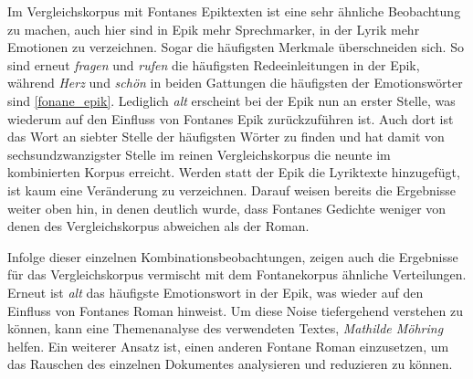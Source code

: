 \documentclass[a4paper,10p]{article}
\begin{document}
Im Vergleichskorpus mit Fontanes Epiktexten ist eine sehr ähnliche Beobachtung zu machen, auch hier sind in Epik mehr Sprechmarker, in der Lyrik mehr Emotionen zu verzeichnen. Sogar die häufigsten Merkmale überschneiden sich. So sind erneut \textit{fragen} und \textit{rufen} die häufigsten Redeeinleitungen in der Epik, während \textit{Herz} und \textit{schön} in beiden Gattungen die häufigsten der Emotionswörter sind \ref{fonane_epik}. Lediglich \textit{alt} erscheint bei der Epik nun an erster Stelle, was wiederum auf den Einfluss von Fontanes Epik zurückzuführen ist. Auch dort ist das Wort an siebter Stelle der häufigsten Wörter zu finden und hat damit von sechsundzwanzigster Stelle im reinen Vergleichskorpus die neunte im kombinierten Korpus erreicht. Werden statt der Epik die Lyriktexte hinzugefügt, ist kaum eine Veränderung zu verzeichnen. Darauf weisen bereits die Ergebnisse weiter oben hin, in denen deutlich wurde, dass Fontanes Gedichte weniger von denen des Vergleichskorpus abweichen als der Roman. \par 

Infolge dieser einzelnen Kombinationsbeobachtungen, zeigen auch die Ergebnisse für das Vergleichskorpus vermischt mit dem Fontanekorpus ähnliche Verteilungen. Erneut ist \textit{alt} das häufigste Emotionswort in der Epik, was wieder auf den Einfluss von Fontanes Roman hinweist. Um diese Noise tiefergehend verstehen zu können, kann eine Themenanalyse des verwendeten Textes, \textit{Mathilde Möhring} helfen. Ein weiterer Ansatz ist, einen  anderen Fontane Roman einzusetzen, um das Rauschen des einzelnen Dokumentes analysieren und reduzieren zu können.  \par 
\end{document}
